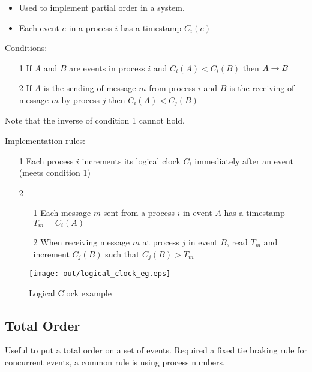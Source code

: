 \documentclass[a4paper]{article}
\begin{document}
\begin{itemize}
  \item Used to implement partial order in a system.
  \item Each event $e$ in a process $i$ has a timestamp $C_{i}(e)$
\end{itemize}

Conditions:

\begin{enumerate}
  \item[1] If $A$ and $B$ are events in process $i$ and $C_{i}(A) < C_{i}(B)$
           then $A \rightarrow B$
  \item[2] If $A$ is the sending of  message $m$ from process $i$ and $B$ is the
           receiving of message $m$ by process $j$ then $C_{i}(A) < C_{j}(B)$
\end{enumerate}

Note that the inverse of condition 1 cannot hold.

Implementation rules:

\begin{enumerate}
  \item[1] Each process $i$ increments its logical clock $C_{i}$ immediately
           after an event (meets condition 1)
  \item[2]
    \begin{enumerate}
      \item[1] Each message $m$ sent from a process $i$ in event $A$ has a
               timestamp $T_{m} = C_{i}(A)$
      \item[2] When receiving message $m$ at process $j$ in event $B$, read
               $T_{m}$ and increment $C_{j}(B)$ such that $C_{j}(B) > T_{m}$
    \end{enumerate}
\end{enumerate}

\begin{figure}[h!]
  \centering
  \texttt{[image: out/logical\_clock\_eg.eps]}
  \caption{Logical Clock example}
  \label{fig:logical_clock_eg}
\end{figure}
\FloatBarrier

\subsection{Total Order}

Useful to put a total order on a set of events. Required a fixed tie braking
rule for concurrent events, a common rule is using process numbers.
\end{document}

